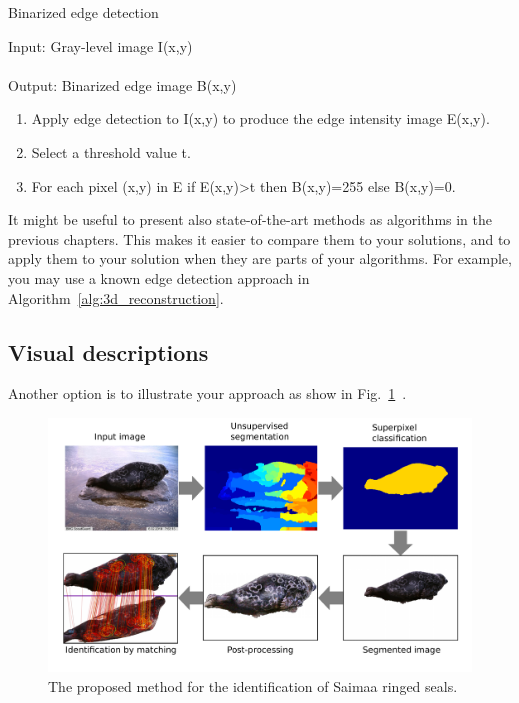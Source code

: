 \documentclass{lutmscthesis}[2017/10/03]
\begin{document}
\begin{algorithm}[!ht]
  \caption{Binarized edge detection}
  \label{alg:3d_reconstruction}
\vspace{8pt}
Input: Gray-level image I(x,y)\\
\vspace{-8pt}\\
Output: Binarized edge image B(x,y)
  \begin{enumerate}
    \item Apply edge detection to I(x,y) to produce the edge intensity image E(x,y). 
    \item Select a threshold value t. 
    \item For each pixel (x,y) in E if E(x,y)>t then B(x,y)=255 else  B(x,y)=0. 
  \end{enumerate}
\end{algorithm}

It might be useful to present also state-of-the-art methods as algorithms in the previous chapters. 
This makes it easier to compare them to your solutions, and to apply them to your solution when they are parts of your algorithms. 
For example, you may use a known edge detection approach in Algorithm~\ref{alg:3d_reconstruction}.  

\subsection{Visual descriptions}

Another option is to illustrate your approach as show in Fig.~\ref{fig:framework}~\cite{norppa2017}.

\begin{figure}[ht]
\begin{center}
\includegraphics[width=\textwidth]{resources/framework.pdf}
\caption{The proposed method for the identification of Saimaa ringed seals.~\cite{norppa2017}} \label{fig:framework}
\end{center}
\end{figure}
\end{document}

